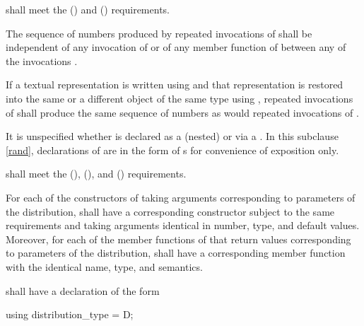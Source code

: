 \pnum
{} shall meet the
 ()
and  () requirements.

\pnum
The sequence of numbers
produced by repeated invocations of 
shall be independent of any invocation of
or of
any  member function of 
between any of the invocations .

\pnum
If a textual representation is written using 
and that representation is restored
into the same or a different object 
of the same type using ,
repeated invocations of 
shall produce the same sequence of numbers
as would repeated invocations of .

\pnum
It is unspecified whether 
is declared as a (nested) 
or via a .
In this subclause \ref{rand},
declarations of 
are in the form of s
for convenience of exposition only.

\pnum
{} shall meet the
 (),
 (),
and
 () requirements.

\pnum
For each of the constructors of 
taking arguments corresponding to parameters of the distribution,
 shall have a corresponding constructor
subject to the same requirements
and taking arguments identical in number, type, and default values.
Moreover,
for each of the member functions of 
that return values corresponding to parameters of the distribution,
 shall have a corresponding member function
with the identical name, type, and semantics.

\pnum
{} shall have a declaration of the form
\begin{codeblock}
using distribution_type =  D;
\end{codeblock}

%
%




